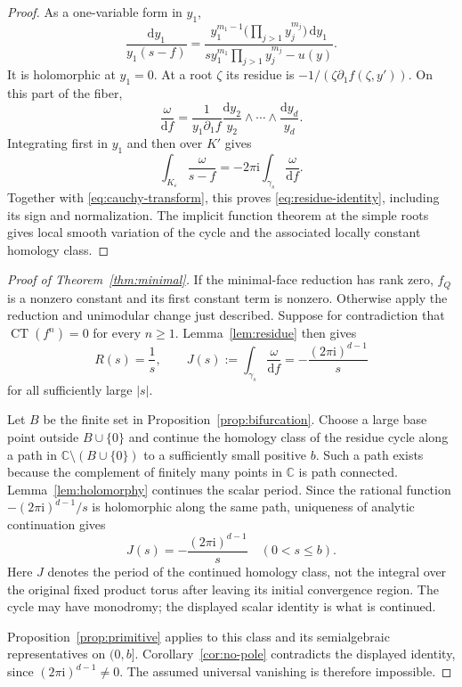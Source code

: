 \documentclass[11pt]{article}
\numberwithin{equation}{section}
\theoremstyle{definition}
\theoremstyle{remark}
\newcommand{\C}{\mathbb C}
\newcommand{\CT}{\operatorname{CT}}
\newcommand{\dd}{\mathrm d}
\newcommand{\ii}{\mathrm i}
\begin{document}
\begin{proof}
As a one-variable form in $y_1$,
\[
 \frac{\dd y_1}{y_1(s-f)}
 =\frac{y_1^{m_1-1}\bigl(\prod_{j>1}y_j^{m_j}\bigr)\,\dd y_1}
 {s y_1^{m_1}\prod_{j>1}y_j^{m_j}-u(y)}.
\]
It is holomorphic at $y_1=0$. At a root $\zeta$ its residue is
$-1/(\zeta\partial_1f(\zeta,y'))$.
On this part of the fiber,
\[
 \frac{\omega}{\dd f}
 =\frac{1}{y_1\partial_1f}
   \frac{\dd y_2}{y_2}\wedge\cdots\wedge\frac{\dd y_d}{y_d}.
\]
Integrating first in $y_1$ and then over $K'$ gives
\[
 \int_{K_\varepsilon}\frac{\omega}{s-f}
 =-2\pi\ii\int_{\gamma_s}\frac{\omega}{\dd f}.
\]
Together with \eqref{eq:cauchy-transform}, this proves
\eqref{eq:residue-identity}, including its sign and normalization.
The implicit function theorem at the simple roots gives local smooth
variation of the cycle and the associated locally constant homology class.
\end{proof}

\begin{proof}[Proof of Theorem~\ref{thm:minimal}]
If the minimal-face reduction has rank zero, $f_Q$ is a nonzero constant
and its first constant term is nonzero. Otherwise apply the reduction
and unimodular change just described. Suppose for contradiction that
$\CT(f^n)=0$ for every $n\ge1$. Lemma~\ref{lem:residue} then gives
\[
 R(s)=\frac1s,\qquad
 J(s):=\int_{\gamma_s}\frac{\omega}{\dd f}
      =-\frac{(2\pi\ii)^{d-1}}s
\]
for all sufficiently large $|s|$.

Let $B$ be the finite set in Proposition~\ref{prop:bifurcation}.
Choose a large base point outside $B\cup\{0\}$ and continue the
homology class of the residue cycle along a path in
$\C\setminus(B\cup\{0\})$ to a sufficiently small positive $b$.
Such a path exists because the complement of finitely many points in
$\C$ is path connected. Lemma~\ref{lem:holomorphy} continues the scalar
period. Since the rational function $-(2\pi\ii)^{d-1}/s$ is holomorphic
along the same path, uniqueness of analytic continuation gives
\[
 J(s)=-\frac{(2\pi\ii)^{d-1}}s\quad(0<s\le b).
\]
Here $J$ denotes the period of the continued homology class, not the
integral over the original fixed product torus after leaving its initial
convergence region. The cycle may have monodromy; the displayed scalar
identity is what is continued.

Proposition~\ref{prop:primitive} applies to this class and its
semialgebraic representatives on $(0,b]$. Corollary~\ref{cor:no-pole}
contradicts the displayed identity, since $(2\pi\ii)^{d-1}\ne0$.
The assumed universal vanishing is therefore impossible.
\end{proof}
\end{document}
